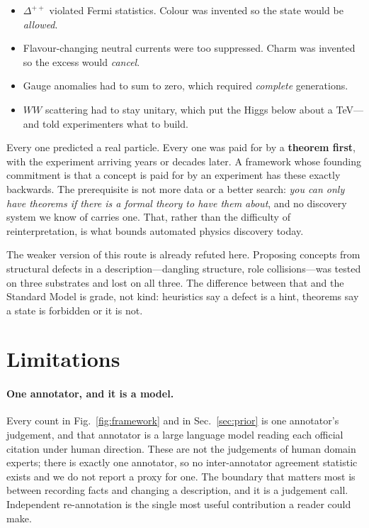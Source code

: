 \documentclass[aps,pra,twocolumn,superscriptaddress,nofootinbib,10pt]{revtex4-2}
\begin{document}
\begin{itemize}\itemsep2pt
\item $\Delta^{++}$ violated Fermi statistics. Colour was invented so the state would be
      \emph{allowed}.
\item Flavour-changing neutral currents were too suppressed. Charm was invented so the excess
      would \emph{cancel}.
\item Gauge anomalies had to sum to zero, which required \emph{complete} generations.
\item $WW$ scattering had to stay unitary, which put the Higgs below about a TeV---and told
      experimenters what to build.
\end{itemize}

Every one predicted a real particle. Every one was paid for by a \textbf{theorem first}, with the
experiment arriving years or decades later. A framework whose founding commitment is that a
concept is paid for by an experiment has these exactly backwards. The prerequisite is not more
data or a better search: \emph{you can only have theorems if there is a formal theory to have
them about}, and no discovery system we know of carries one. That, rather than the difficulty of
reinterpretation, is what bounds automated physics discovery today.

The weaker version of this route is already refuted here. Proposing concepts from structural
defects in a description---dangling structure, role collisions---was tested on three substrates
and lost on all three. The difference between that and the Standard Model is grade, not kind:
heuristics say a defect is a hint, theorems say a state is forbidden or it is not.

\section{Limitations}

\paragraph{One annotator, and it is a model.} Every count in Fig.~\ref{fig:framework} and in
Sec.~\ref{sec:prior} is one annotator's judgement, and that annotator is a large language model
reading each official citation under human direction. These are not the judgements of human
domain experts; there is exactly one annotator, so no inter-annotator agreement statistic exists
and we do not report a proxy for one. The boundary that matters most is between recording facts
and changing a description, and it is a judgement call. Independent re-annotation is the single
most useful contribution a reader could make.
\end{document}
